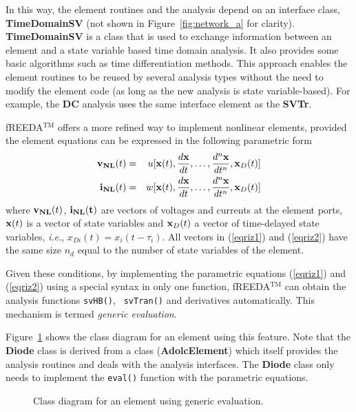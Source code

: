 In this way, the element routines and the analysis depend on an
interface class, {\bf TimeDomainSV} (not shown in
Figure~\ref{fig:network_a} for clarity).  {\bf TimeDomainSV} is a class
that is used to exchange information between an element and a state
variable based time domain analysis. It also provides some basic
algorithms such as time differentiation methods. This approach enables
the element routines to be reused by several analysis types without
the need to modify the element code (as long as the new analysis is
state variable-based). For example, the {\bf DC} analysis uses the
same interface element as the {\bf SVTr}.

fREEDA$^{\mathrm{TM}}$ offers a more refined way to implement nonlinear elements,
provided the element equations can be expressed in the following
parametric form~\cite{rizzoli:92:1}
\begin{eqnarray}
  {\bf v_{NL}}(t) &=& u[{\bf x}(t), \frac{d{\bf x}}{dt}, \dots , 
                 \frac{d^n{\bf x}}{dt^n}, {\bf x}_D(t)] \label{eqriz1}\\
  {\bf i_{NL}}(t) &=& w[{\bf x}(t), \frac{d{\bf x}}{dt}, \dots ,
                 \frac{d^n{\bf x}}{dt^n}, {\bf x}_D(t)] 
  \label{eqriz2}
\end{eqnarray}
where ${\bf v_{NL}}(t)$, ${\bf i_{NL}(t)}$ are vectors of voltages and
currents at the element ports, ${\bf x}(t)$ is a vector of state
variables and ${\bf x}_D(t)$ a vector of time-delayed state variables,
\emph{i.e.}, $x_{Di}(t)=x_i(t-\tau_i)$. All vectors in (\ref{eqriz1})
and (\ref{eqriz2}) have the same size $n_d$ equal to the number of
state variables of the element.

Given these conditions, by implementing the parametric equations
(\ref{eqriz1}) and (\ref{eqriz2}) using a special syntax in only one
function, fREEDA$^{\mathrm{TM}}$ can obtain the analysis functions {\tt svHB()}, {\tt
svTran()} and derivatives automatically. This mechanism is termed
\emph{generic evaluation}.

Figure~\ref{fig:adolcelement} shows the class diagram for an element
using this feature. Note that the {\bf Diode} class is derived from a
class ({\bf AdolcElement}) which itself provides the analysis routines
and deals with the analysis interfaces. The {\bf Diode} class only
needs to implement the {\tt eval()} function with the parametric
equations.

%
\begin{figure}[htpb]
\centerline{\epsfxsize=12cm }
\caption{Class diagram for an element using generic evaluation.} 
\label{fig:adolcelement}
\end{figure}
%

